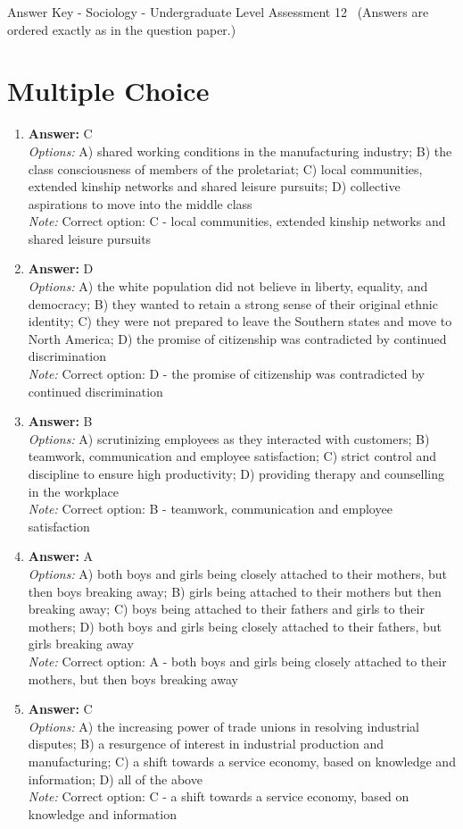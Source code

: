 \documentclass[12pt]{article}
\begin{document}
\begin{center}
Answer Key - Sociology - Undergraduate Level Assessment 12 \
\small (Answers are ordered exactly as in the question paper.)
\end{center}

\section*{Multiple Choice}
\begin{enumerate}[label=\arabic*.]
\item \textbf{Answer:} C
\\ \textit{Options:} A) shared working conditions in the manufacturing industry; B) the class consciousness of members of the proletariat; C) local communities, extended kinship networks and shared leisure pursuits; D) collective aspirations to move into the middle class
\\ \textit{Note:} Correct option: C - local communities, extended kinship networks and shared leisure pursuits
\item \textbf{Answer:} D
\\ \textit{Options:} A) the white population did not believe in liberty, equality, and democracy; B) they wanted to retain a strong sense of their original ethnic identity; C) they were not prepared to leave the Southern states and move to North America; D) the promise of citizenship was contradicted by continued discrimination
\\ \textit{Note:} Correct option: D - the promise of citizenship was contradicted by continued discrimination
\item \textbf{Answer:} B
\\ \textit{Options:} A) scrutinizing employees as they interacted with customers; B) teamwork, communication and employee satisfaction; C) strict control and discipline to ensure high productivity; D) providing therapy and counselling in the workplace
\\ \textit{Note:} Correct option: B - teamwork, communication and employee satisfaction
\item \textbf{Answer:} A
\\ \textit{Options:} A) both boys and girls being closely attached to their mothers, but then boys breaking away; B) girls being attached to their mothers but then breaking away; C) boys being attached to their fathers and girls to their mothers; D) both boys and girls being closely attached to their fathers, but girls breaking away
\\ \textit{Note:} Correct option: A - both boys and girls being closely attached to their mothers, but then boys breaking away
\item \textbf{Answer:} C
\\ \textit{Options:} A) the increasing power of trade unions in resolving industrial disputes; B) a resurgence of interest in industrial production and manufacturing; C) a shift towards a service economy, based on knowledge and information; D) all of the above
\\ \textit{Note:} Correct option: C - a shift towards a service economy, based on knowledge and information
\end{enumerate}
\end{document}
